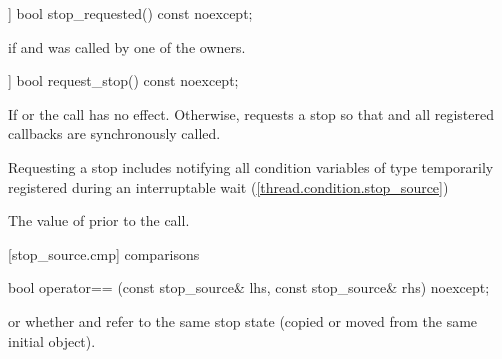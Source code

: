 {%
\begin{itemdecl}
[[nodiscard]] bool stop_requested() const noexcept;
\end{itemdecl}
\begin{itemdescr}
  \pnum\returns {} if  
                and  was called by one of the owners.
\end{itemdescr}

%
\begin{itemdecl}
[[nodiscard]] bool request_stop() const noexcept;
\end{itemdecl}
\begin{itemdescr}

  \pnum\effects If  or  the call has no effect. 
                Otherwise, requests a stop so that 
                and all registered callbacks are synchronously called.
                \begin{note} Requesting a stop includes notifying all condition variables
                             of type 
                             temporarily registered during an interruptable wait (\ref{thread.condition.stop_source})
                             \end{note}

  \pnum\postconditions {}

  \pnum\returns The value of  prior to the call.
\end{itemdescr}


[stop_source.cmp]{ comparisons}

%
\begin{itemdecl}
bool operator== (const stop_source& lhs, const stop_source& rhs) noexcept;
\end{itemdecl}
\begin{itemdescr}
  \pnum\returns {} or
                whether  and  refer to the
                same stop state
                (copied or moved from the same initial  object).
\end{itemdescr}

}
